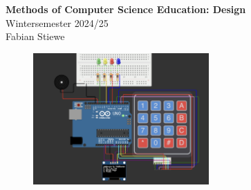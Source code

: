 \documentclass[10pt]{article}
\begin{document}
\begin{center}
  \Large \textbf{Methods of Computer Science Education: Design} \\
  \normalsize Wintersemester 2024/25 \\
  \normalsize Fabian Stiewe
\end{center}

\begin{figure}[h]
  \begin{center}
    \includegraphics[width=0.6\textwidth]{diagram.png}
  \end{center}
\end{figure}
\end{document}

